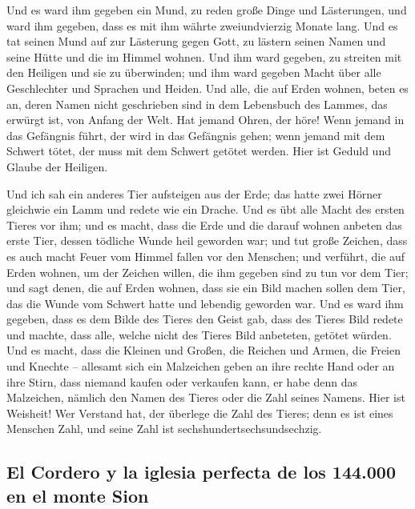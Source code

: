  Und es ward ihm gegeben ein Mund, zu reden große Dinge
und Lästerungen, und ward ihm gegeben, dass es mit ihm währte
zweiundvierzig Monate lang.  Und es tat seinen Mund auf
zur Lästerung gegen Gott, zu lästern seinen Namen und seine Hütte und
die im Himmel wohnen.  Und ihm ward gegeben, zu streiten
mit den Heiligen und sie zu überwinden; und ihm ward gegeben Macht über
alle Geschlechter und Sprachen und Heiden.  Und alle, die
auf Erden wohnen, beten es an, deren Namen nicht geschrieben sind in dem
Lebensbuch des Lammes, das erwürgt ist, von Anfang der Welt.
 Hat jemand Ohren, der höre!  Wenn jemand
in das Gefängnis führt, der wird in das Gefängnis gehen; wenn jemand mit
dem Schwert tötet, der muss mit dem Schwert getötet werden. Hier ist
Geduld und Glaube der Heiligen.

 Und ich sah ein anderes Tier aufsteigen aus der Erde;
das hatte zwei Hörner gleichwie ein Lamm und redete wie ein Drache.
 Und es übt alle Macht des ersten Tieres vor ihm; und es
macht, dass die Erde und die darauf wohnen anbeten das erste Tier,
dessen tödliche Wunde heil geworden war;  und tut große
Zeichen, dass es auch macht Feuer vom Himmel fallen vor den Menschen;
 und verführt, die auf Erden wohnen, um der Zeichen
willen, die ihm gegeben sind zu tun vor dem Tier; und sagt denen, die
auf Erden wohnen, dass sie ein Bild machen sollen dem Tier, das die
Wunde vom Schwert hatte und lebendig geworden war.  Und
es ward ihm gegeben, dass es dem Bilde des Tieres den Geist gab, dass
des Tieres Bild redete und machte, dass alle, welche nicht des Tieres
Bild anbeteten, getötet würden.  Und es macht, dass die
Kleinen und Großen, die Reichen und Armen, die Freien und Knechte --
allesamt sich ein Malzeichen geben an ihre rechte Hand oder an ihre
Stirn,  dass niemand kaufen oder verkaufen kann, er habe
denn das Malzeichen, nämlich den Namen des Tieres oder die Zahl seines
Namens.  Hier ist Weisheit! Wer Verstand hat, der
überlege die Zahl des Tieres; denn es ist eines Menschen Zahl, und seine
Zahl ist sechshundertsechsundsechzig.

\hypertarget{el-cordero-y-la-iglesia-perfecta-de-los-144.000-en-el-monte-sion}{%
\subsection{El Cordero y la iglesia perfecta de los 144.000 en el monte
Sion}\label{el-cordero-y-la-iglesia-perfecta-de-los-144.000-en-el-monte-sion}}

